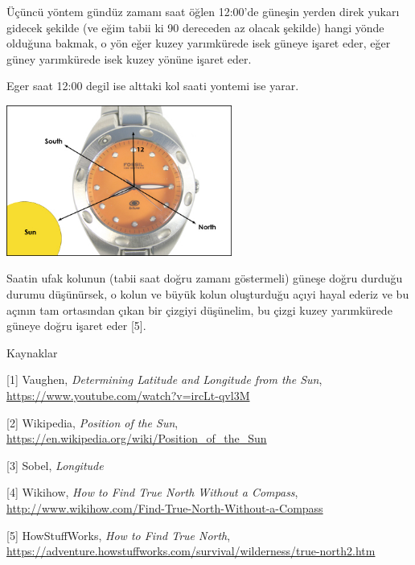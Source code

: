 \documentclass[12pt,fleqn]{article}\usepackage{../../common}
\begin{document}
Üçüncü yöntem gündüz zamanı saat öğlen 12:00'de güneşin yerden direk yukarı
gidecek şekilde (ve eğim tabii ki 90 dereceden az olacak şekilde) hangi
yönde olduğuna bakmak, o yön eğer kuzey yarımkürede isek güneye işaret
eder, eğer güney yarımkürede isek kuzey yönüne işaret eder. 

Eger saat 12:00 degil ise alttaki kol saati yontemi ise yarar. 

\includegraphics[width=20em]{watch2.jpg}

Saatin ufak kolunun (tabii saat doğru zamanı göstermeli) güneşe doğru
durduğu durumu düşünürsek, o kolun ve büyük kolun oluşturduğu açıyi hayal
ederiz ve bu açının tam ortasından çıkan bir çizgiyi düşünelim, bu çizgi
kuzey yarımkürede güneye doğru işaret eder [5]. 


Kaynaklar

[1] Vaughen, {\em Determining Latitude and Longitude from the Sun}, \url{https://www.youtube.com/watch?v=ircLt-qvl3M}

[2] Wikipedia, {\em Position of the Sun}, \url{https://en.wikipedia.org/wiki/Position_of_the_Sun}

[3] Sobel, {\em Longitude}

[4] Wikihow, {\em How to Find True North Without a Compass}, \url{http://www.wikihow.com/Find-True-North-Without-a-Compass}

[5] HowStuffWorks, {\em How to Find True North}, \url{https://adventure.howstuffworks.com/survival/wilderness/true-north2.htm}
\end{document}
